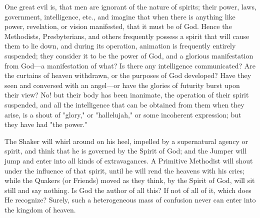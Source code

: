 One great evil is, that men are ignorant of the nature of spirits; their power, laws,
government, intelligence, etc., and imagine that when there is anything like power,
revelation, or vision manifested, that it must be of God. Hence the Methodists, Presbyterians,
and others frequently possess a spirit that will cause them to lie down, and during its
operation, animation is frequently entirely suspended; they consider it to be the power of
God, and a glorious manifestation from God—a manifestation of what? Is there any
intelligence communicated? Are the curtains of heaven withdrawn, or the purposes of God
developed? Have they seen and conversed with an angel—or have the glories of futurity
burst upon their view? No! but their body has been inanimate, the operation of their spirit
suspended, and all the intelligence that can be obtained from them when they arise, is a shout
of "glory," or "hallelujah," or some incoherent expression; but they have had "the power."

The Shaker will whirl around on his heel, impelled by a supernatural agency or spirit, and
think that he is governed by the Spirit of God; and the Jumper will jump and enter into all
kinds of extravagances. A Primitive Methodist will shout under the influence of that spirit,
until he will rend the heavens with his cries; while the Quakers (or Friends) moved as they
think, by the Spirit of God, will sit still and say nothing. Is God the author of all this? If not
of all of it, which does He recognize? Surely, such a heterogeneous mass of confusion never
can enter into the kingdom of heaven.

